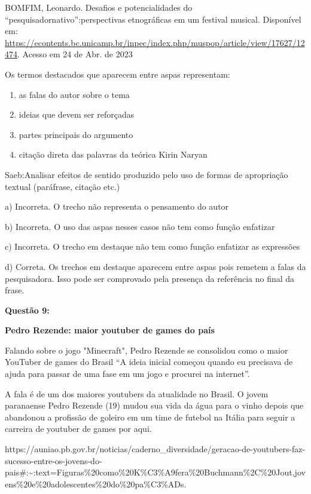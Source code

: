 BOMFIM, Leonardo. Desafios e potencialidades do
``pesquisadornativo'':perspectivas etnográficas em um festival musical.
Disponível em:
\href{https://econtents.bc.unicamp.br/inpec/index.php/muspop/article/view/17627/12474}{{https://econtents.bc.unicamp.br/inpec/index.php/muspop/article/view/17627/12474}}.
Acesso em 24 de Abr. de 2023

Os termos destacados que aparecem entre aspas representam:

\begin{enumerate}
\def\labelenumi{\alph{enumi})}
\item
  as falas do autor sobre o tema
\item
  ideias que devem ser reforçadas
\item
  partes principais do argumento
\item
  citação direta das palavras da teórica Kirin Naryan
\end{enumerate}

Saeb:Analisar efeitos de sentido produzido pelo uso de formas de
apropriação textual (paráfrase, citação etc.)

a) Incorreta. O trecho não representa o pensamento do autor

b) Incorreta. O uso das aspas nesses casos não tem como função enfatizar

c) Incorreta. O trecho em destaque não tem como função enfatizar as
expressões

d) Correta. Os trechos em destaque aparecem entre aspas pois remetem a
falas da pesquisadora. Isso pode ser comprovado pela presença da
referência no final da frase.

\textbf{Questão 9:}

\textbf{Pedro Rezende: maior youtuber de games do país}

Falando sobre o jogo "Minecraft", Pedro Rezende se consolidou como o
maior YouTuber de games do Brasil ``A ideia inicial começou quando eu
precisava de ajuda para passar de uma fase em um jogo e procurei na
internet''.

A fala é de um dos maiores youtubers da atualidade no Brasil. O jovem
paranaense Pedro Rezende (19) mudou sua vida da água para o vinho depois
que abandonou a profissão de goleiro em um time de futebol na Itália
para seguir a carreira de youtuber de games por aqui.

https://auniao.pb.gov.br/noticias/caderno\_diversidade/geracao-de-youtubers-faz-sucesso-entre-os-jovens-do-pais\#:\textasciitilde:text=Figuras\%20como\%20K\%C3\%A9fera\%20Buchmann\%2C\%20Jout,jovens\%20e\%20adolescentes\%20do\%20pa\%C3\%ADs.

